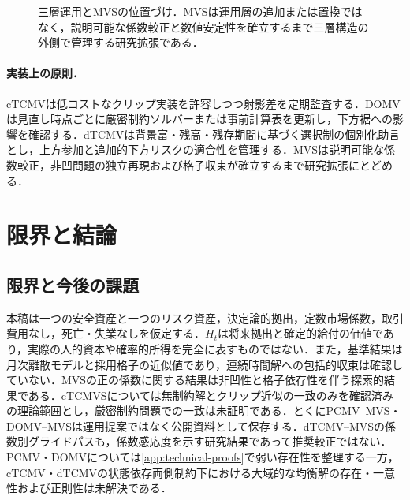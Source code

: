 \documentclass[10pt,a4paper]{article}
\theoremstyle{plain}
\theoremstyle{definition}
\begin{document}
\begin{figure}[H]
\centering
{}
\caption{三層運用とMVSの位置づけ．MVSは運用層の追加または置換ではなく，説明可能な係数較正と数値安定性を確立するまで三層構造の外側で管理する研究拡張である．}
\label{fig:three-layer}
\end{figure}

\paragraph{実装上の原則．}
cTCMVは低コストなクリップ実装を許容しつつ射影差を定期監査する．DOMVは見直し時点ごとに厳密制約ソルバーまたは事前計算表を更新し，下方裾への影響を確認する．dTCMVは背景富・残高・残存期間に基づく選択制の個別化助言とし，上方参加と追加的下方リスクの適合性を管理する．MVSは説明可能な係数較正，非凹問題の独立再現および格子収束が確立するまで研究拡張にとどめる．

\section{限界と結論}
\label{sec:conclusion}

\subsection{限界と今後の課題}
本稿は一つの安全資産と一つのリスク資産，決定論的拠出，定数市場係数，取引費用なし，死亡・失業なしを仮定する．$H_t$は将来拠出と確定的給付の価値であり，実際の人的資本や確率的所得を完全に表すものではない．また，基準結果は月次離散モデルと採用格子の近似値であり，連続時間解への包括的収束は確認していない．MVSの正の係数に関する結果は非凹性と格子依存性を伴う探索的結果である．cTCMVSについては無制約解とクリップ近似の一致のみを確認済みの理論範囲とし，厳密制約問題での一致は未証明である．とくにPCMV--MVS・DOMV--MVSは運用提案ではなく公開資料として保存する．dTCMV--MVSの係数別グライドパスも，係数感応度を示す研究結果であって推奨較正ではない．PCMV・DOMVについては\ref{app:technical-proofs}で弱い存在性を整理する一方，cTCMV・dTCMVの状態依存両側制約下における大域的な均衡解の存在・一意性および正則性は未解決である．
\end{document}
